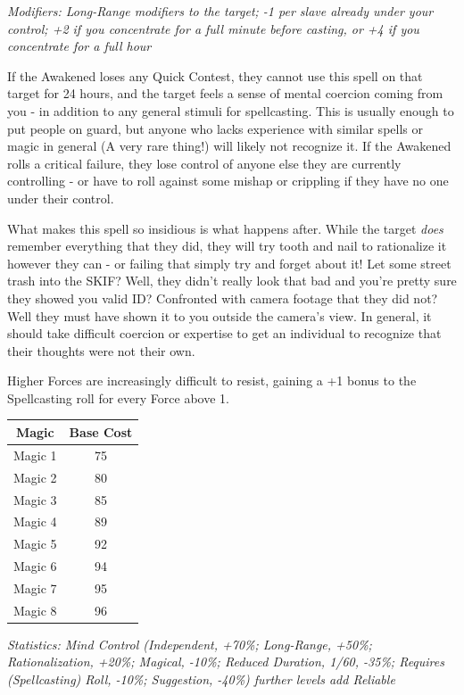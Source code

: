 \begin{multicols*}{3}
	\textcolor{NavyBlue}{\textit{Modifiers: Long-Range modifiers to the target; -1 per slave already under your control; +2 if you concentrate for a full minute before casting, or +4 if you concentrate for a full hour}}
	
	If the Awakened loses any Quick Contest, they cannot use this spell on that target for 24 hours, and the target feels a sense of mental coercion coming from you - in addition to any general stimuli for spellcasting. This is usually enough to put people on guard, but anyone who lacks experience with similar spells or magic in general (A very rare thing!) will likely not recognize it. If the Awakened rolls a critical failure, they lose control of anyone else they are currently controlling - or have to roll against some mishap or crippling if they have no one under their control.
	
	What makes this spell so insidious is what happens after. While the target \textit{does} remember everything that they did, they will try tooth and nail to rationalize it however they can - or failing that simply try and forget about it! Let some street trash into the SKIF? Well, they didn't really look that bad and you're pretty sure they showed you valid ID? Confronted with camera footage that they did not? Well they must have shown it to you outside the camera's view. In general, it should take difficult coercion or expertise to get an individual to recognize that their thoughts were not their own.
	
	Higher Forces are increasingly difficult to resist, gaining a +1 bonus to the Spellcasting roll for every Force above 1.
	
	\begin{center}
		\begin{tabular}{|c|c|}
			\hline
			Magic & Base Cost \\
			\hline
			\hline
			Magic 1 & 75 \\
			Magic 2 & 80 \\
			Magic 3 & 85 \\
			Magic 4 & 89 \\
			Magic 5 & 92 \\
			Magic 6 & 94 \\
			Magic 7 & 95 \\
			Magic 8 & 96 \\
			\hline
		\end{tabular}
	\end{center}	
	
	\textcolor{OliveGreen}{\textit{Statistics: Mind Control (Independent, +70\%; Long-Range, +50\%; Rationalization, +20\%; Magical, -10\%; Reduced Duration, 1/60, -35\%; Requires (Spellcasting) Roll, -10\%; Suggestion, -40\%) further levels add Reliable}}
	

\end{multicols*}

